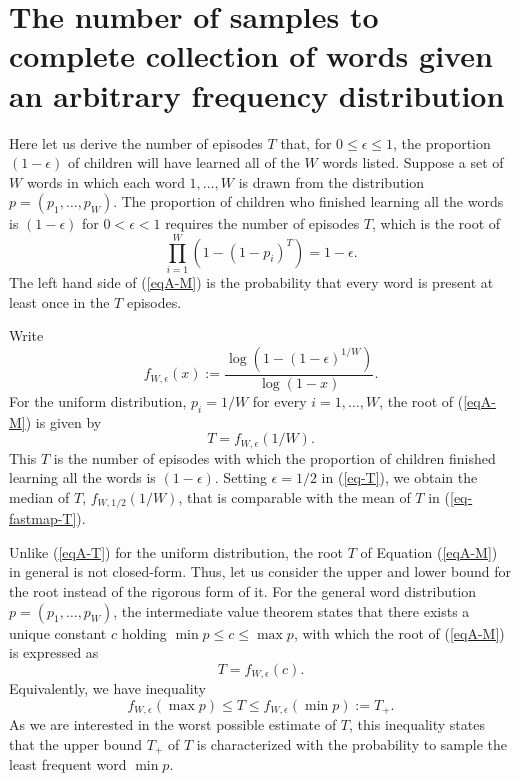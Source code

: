 \documentclass[a4paper,natbib,man]{apa6}
\begin{document}

\setlength{\bibleftmargin}{.125in}
\setlength{\bibindent}{-\bibleftmargin}



\appendix

\section{The number of samples to complete collection of words given an arbitrary frequency distribution}
Here let us derive the number of episodes $T$ that, for $0 \le \epsilon \le 1$, the proportion $(1-\epsilon)$ of children will have learned all of the $W$ words listed.
Suppose a set of $W$ words in which each word $1, \ldots, W$ is drawn from the distribution $p = (p_{1}, \ldots, p_{W})$.
The proportion of children who finished learning all the words is $(1 - \epsilon)$ for $0 < \epsilon < 1$ requires the number of episodes $T$, which is the root of 
\begin{equation}
\label{eqA-M}
 \prod_{i=1}^{W}\left( 1 - ( 1 - p_{i} )^{T} \right) = 1 - \epsilon.
\end{equation}
The left hand side of (\ref{eqA-M}) is the probability that every word is present at least once in the $T$ episodes.

Write 
\[
 f_{W, \epsilon}( x ) := 
\frac{ 
  \log\left( 1 - ( 1 - \epsilon )^{1/W} \right) 
}{ 
  \log\left( 1 - x \right) 
}.
\]
For the uniform distribution, $p_{i} = 1/W$ for every $i = 1, \ldots, W$, 
the root of (\ref{eqA-M}) is given by 
\begin{equation}
\label{eqA-T}
 T = f_{W, \epsilon}( 1/W ).
\end{equation}
This $T$ is the number of episodes with which the proportion of children finished learning all the words is $(1 - \epsilon)$.
Setting $\epsilon = 1/2$ in (\ref{eq-T}), we obtain the median of $T$, $f_{W,1/2}(1/W)$, that is comparable with the mean of $T$ in (\ref{eq-fastmap-T}).

Unlike (\ref{eqA-T}) for the uniform distribution, the root $T$ of Equation (\ref{eqA-M}) in general is not closed-form.
Thus, let us consider the upper and lower bound for the root instead of the rigorous form of it.
For the general word distribution $p = (p_{1}, \ldots, p_{W})$, 
the intermediate value theorem states that  
there exists a unique constant $c$ holding $\min p \le c \le \max p$, with which 
the root of (\ref{eqA-M})  is expressed as
\[
 T = f_{W, \epsilon}( c ).
\]
Equivalently, we have inequality
\begin{equation}
f_{W, \epsilon}( \max p ) \le T \le f_{W, \epsilon}( \min p ) := T_{+}.
\label{eqA-Tbound}
\end{equation}
As we are interested in the worst possible estimate of $T$, 
this inequality states that 
the upper bound $T_{+}$ of $T$ is characterized with 
the probability to sample the least frequent word $\min p$.
\end{document}
